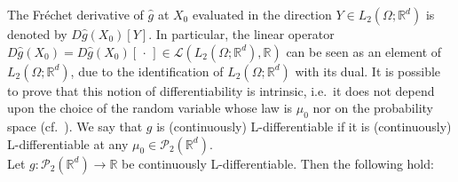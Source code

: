 \documentclass[10pt, a4paper]{article} %
\newcommand{\R}{\mathbb{R}}
\theoremstyle{definition}
\theoremstyle{plain}
\begin{document}
{
\noindent The Fréchet derivative of $\hat{g}$ at $X_0$ evaluated in the direction $Y \in L_2(\Omega;\R^d)$ is denoted by $D\hat{g}(X_0)[Y]$. In particular, the linear operator $D \hat g (X_0) = D \hat g (X_0) [\, \cdot \,] \in \mathscr{L}(L_2(\Omega;\R^d) , \R)$ can be seen as an element of $L_2(\Omega;\R^d)$, due to the identification of  $L_2(\Omega;\R^d)$ with its dual. 
}
It is possible to prove that this notion of differentiability is intrinsic, i.e.\ it does not depend upon the choice of the random variable whose law is $\mu_0$ nor on the probability space (cf.\ \cite[Proposition 5.24]{CARMONADELARUE_volumeI}). We say that $g$ is (continuously) L-differentiable if it is (continuously) L-differentiable at any $\mu_0 \in \mathcal{P}_2(\R^d)$. \\

\noindent Let $g:\mathcal{P}_2(\R^d) \to \R$ be continuously L-differentiable. Then the following hold:
\end{document}
